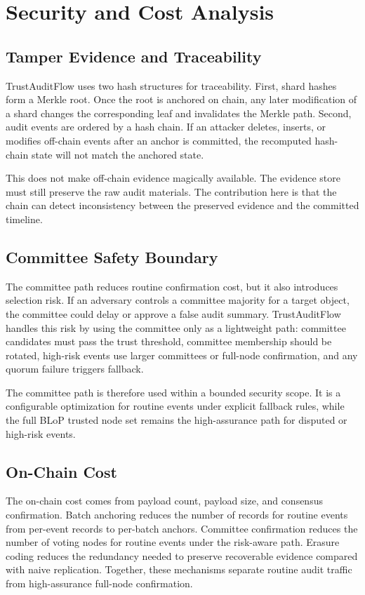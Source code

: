 \section{Security and Cost Analysis}

\subsection{Tamper Evidence and Traceability}

TrustAuditFlow uses two hash structures for traceability. First, shard hashes form a Merkle root. Once the root is anchored on chain, any later modification of a shard changes the corresponding leaf and invalidates the Merkle path. Second, audit events are ordered by a hash chain. If an attacker deletes, inserts, or modifies off-chain events after an anchor is committed, the recomputed hash-chain state will not match the anchored state.

This does not make off-chain evidence magically available. The evidence store must still preserve the raw audit materials. The contribution here is that the chain can detect inconsistency between the preserved evidence and the committed timeline.

\subsection{Committee Safety Boundary}

The committee path reduces routine confirmation cost, but it also introduces selection risk. If an adversary controls a committee majority for a target object, the committee could delay or approve a false audit summary. TrustAuditFlow handles this risk by using the committee only as a lightweight path: committee candidates must pass the trust threshold, committee membership should be rotated, high-risk events use larger committees or full-node confirmation, and any quorum failure triggers fallback.

The committee path is therefore used within a bounded security scope. It is a configurable optimization for routine events under explicit fallback rules, while the full BLoP trusted node set remains the high-assurance path for disputed or high-risk events.

\subsection{On-Chain Cost}

The on-chain cost comes from payload count, payload size, and consensus confirmation. Batch anchoring reduces the number of records for routine events from per-event records to per-batch anchors. Committee confirmation reduces the number of voting nodes for routine events under the risk-aware path. Erasure coding reduces the redundancy needed to preserve recoverable evidence compared with naive replication. Together, these mechanisms separate routine audit traffic from high-assurance full-node confirmation.

